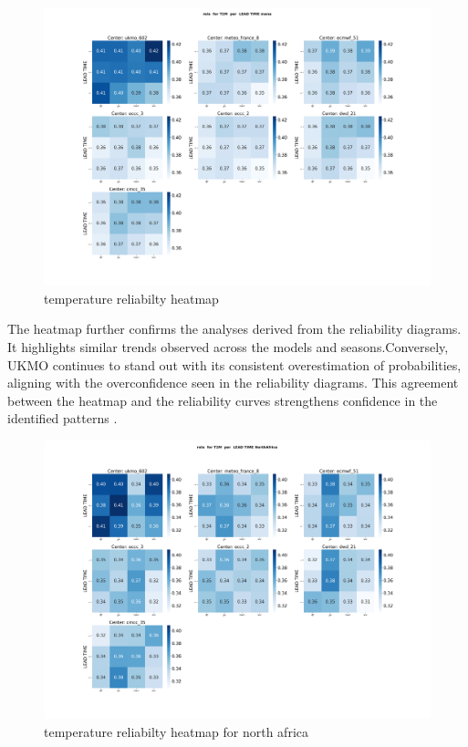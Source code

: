 \begin{figure}[H]
    \centering
    \includegraphics[width=1\linewidth]{plots/prob/rela/rela_T2M_mena.png}
    \caption{temperature reliabilty heatmap}
\end{figure}
The heatmap further confirms the analyses derived from the reliability diagrams. It highlights similar trends observed across the models and seasons.Conversely, UKMO continues to stand out with its consistent overestimation of probabilities, aligning with the overconfidence seen in the reliability diagrams. This agreement between the heatmap and the reliability curves strengthens confidence in the identified patterns .
\begin{figure}[H]
    \centering
    \includegraphics[width=1\linewidth]{plots/prob/rela/rela_T2M_NorthAfrica.png}
    \caption{temperature reliabilty heatmap for north africa}
\end{figure}

